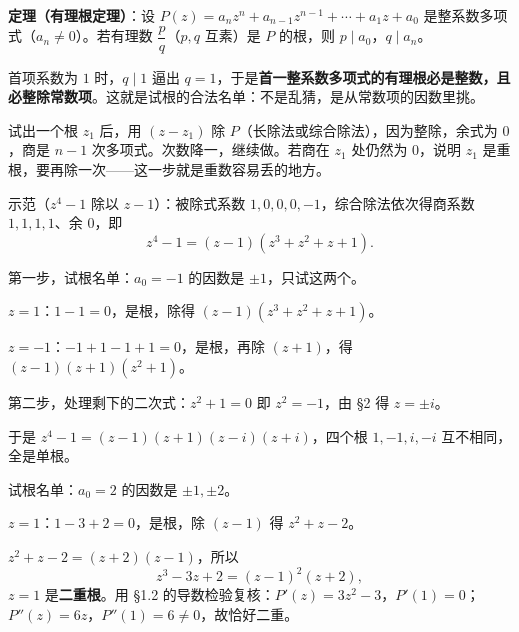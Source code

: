\documentclass[11pt]{ctexart}
\let\origsubhdr\subhdr
\renewcommand{\subhdr}[1]{\par\needspace{4\baselineskip}\origsubhdr{#1}}
\let\orighdr\hdr
\renewcommand{\hdr}[2]{\par\orighdr{#1}{#2}}
\begin{document}


\textbf{定理（有理根定理）}：设 $P(z)=a_nz^{n}+a_{n-1}z^{n-1}+\cdots+a_1z+a_0$ 是整系数多项式（$a_n\ne0$）。若有理数 $\dfrac{p}{q}$（$p,q$ 互素）是 $P$ 的根，则 $p\mid a_0$，$q\mid a_n$。

首项系数为 $1$ 时，$q\mid1$ 逼出 $q=1$，于是\textbf{首一整系数多项式的有理根必是整数，且必整除常数项}。这就是试根的合法名单：不是乱猜，是从常数项的因数里挑。



试出一个根 $z_1$ 后，用 $(z-z_1)$ 除 $P$（长除法或综合除法），因为整除，余式为 $0$，商是 $n-1$ 次多项式。次数降一，继续做。若商在 $z_1$ 处仍然为 $0$，说明 $z_1$ 是重根，要再除一次——这一步就是重数容易丢的地方。

示范（$z^{4}-1$ 除以 $z-1$）：被除式系数 $1,0,0,0,-1$，综合除法依次得商系数 $1,1,1,1$、余 $0$，即
\[ z^{4}-1=(z-1)\left(z^{3}+z^{2}+z+1\right). \]


第一步，试根名单：$a_0=-1$ 的因数是 $\pm1$，只试这两个。

$z=1$：$1-1=0$，是根，除得 $(z-1)(z^{3}+z^{2}+z+1)$。

$z=-1$：$-1+1-1+1=0$，是根，再除 $(z+1)$，得 $(z-1)(z+1)(z^{2}+1)$。

第二步，处理剩下的二次式：$z^{2}+1=0$ 即 $z^{2}=-1$，由 §2 得 $z=\pm i$。

于是 $z^{4}-1=(z-1)(z+1)(z-i)(z+i)$，四个根 $1,-1,i,-i$ 互不相同，全是单根。



试根名单：$a_0=2$ 的因数是 $\pm1,\pm2$。

$z=1$：$1-3+2=0$，是根，除 $(z-1)$ 得 $z^{2}+z-2$。

$z^{2}+z-2=(z+2)(z-1)$，所以
\[ z^{3}-3z+2=(z-1)^{2}(z+2), \]
$z=1$ 是\textbf{二重根}。用 §1.2 的导数检验复核：$P'(z)=3z^{2}-3$，$P'(1)=0$；$P''(z)=6z$，$P''(1)=6\ne0$，故恰好二重。
\end{document}
